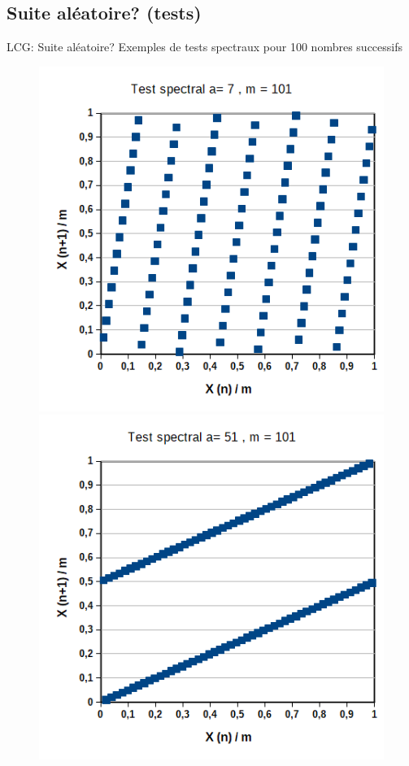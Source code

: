\documentclass{beamer}
\begin{document}
\subsection{Suite aléatoire? (tests)}
\begin{frame}{LCG: Suite aléatoire?}
  Exemples de tests spectraux pour 100 nombres successifs
    \begin{figure}
      \begin{center}
      \includegraphics[scale=0.4]{img/a7m101.png}
      \hspace{0.1\textwidth}
      \includegraphics[scale=0.4]{img/a51m101.png}
      \end{center}
    \end{figure}
\end{frame}
\end{document}
